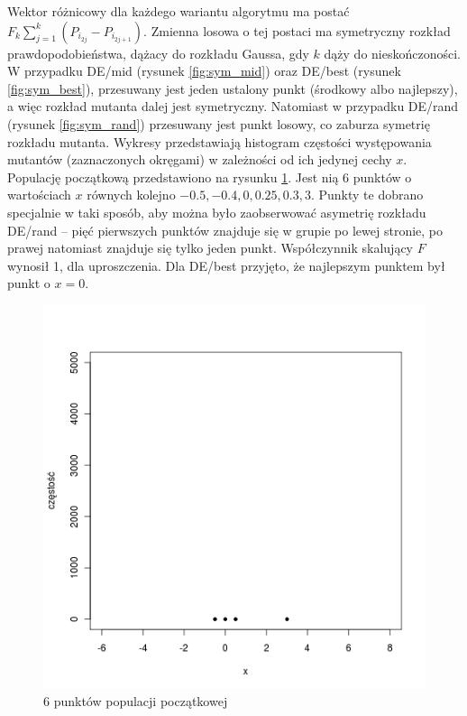 \documentclass[a4paper,onecolumn,oneside,12pt,wide,floatssmall]{mwrep}
\theoremstyle{definition}
\theoremstyle{plain}%
\theoremstyle{remark}
\begin{document}
Wektor różnicowy dla każdego wariantu algorytmu ma postać
$ F_k\sum\limits_{j=1}^k (P_{i_{2j}} - P_{i_{2j+1}}) $. Zmienna losowa o tej postaci
ma symetryczny rozkład prawdopodobieństwa, dążacy do rozkładu Gaussa, gdy $k$ dąży do 
nieskończoności. W przypadku DE/mid (rysunek \ref{fig:sym_mid}) 
oraz DE/best (rysunek \ref{fig:sym_best}),
przesuwany jest jeden ustalony punkt (środkowy albo najlepszy), 
a więc rozkład mutanta dalej jest symetryczny.
Natomiast w przypadku DE/rand (rysunek \ref{fig:sym_rand}) 
przesuwany jest punkt losowy, co zaburza symetrię rozkładu mutanta.
Wykresy przedstawiają histogram częstości występowania
mutantów (zaznaczonych okręgami) w zależności od ich jedynej cechy $x$.
Populację początkową przedstawiono na rysunku \ref{fig:sym_none}.
Jest nią 6 punktów o wartościach $x$ równych kolejno $-0.5, -0.4, 0, 0.25, 0.3, 3$.
Punkty te dobrano specjalnie w taki sposób, aby można było zaobserwować asymetrię
rozkładu DE/rand -- pięć pierwszych punktów znajduje się w grupie po lewej stronie, 
po prawej natomiast znajduje się tylko jeden punkt.
Współczynnik skalujący $F$ wynosił 1, dla uproszczenia.
Dla DE/best przyjęto, że najlepszym punktem był punkt o $x = 0$.

\begin{figure}[H]
\centering
\includegraphics[width=.65\textwidth]{img/none}
\caption{6 punktów populacji początkowej} 
\label{fig:sym_none}
\end{figure}
\end{document}
